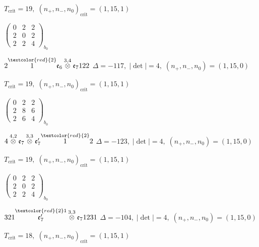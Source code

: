 \documentclass[10pt]{article}
\begin{document}
\hspace{1em}$T_{\text{crit}}=19,\; (n_+,n_-,n_0)_{\text{crit}}=(1,15,1)$

\hspace{2em}$\left(\begin{smallmatrix}0 & 2 & 2 \\ 2 & 0 & 2 \\ 2 & 2 & 4\end{smallmatrix}\right)_{\!b_0}$

\smallskip

$2\overset{\textcolor{red}{2}}{1}\mathfrak{e}_6\overset{3,4}{\otimes}\mathfrak{e}_7122$ \quad $\Delta=-117,\; |\det|=4,\; (n_+,n_-,n_0)=(1,15,0)$

\hspace{1em}$T_{\text{crit}}=19,\; (n_+,n_-,n_0)_{\text{crit}}=(1,15,1)$

\hspace{2em}$\left(\begin{smallmatrix}0 & 2 & 2 \\ 2 & 8 & 6 \\ 2 & 6 & 4\end{smallmatrix}\right)_{\!b_0}$

\smallskip

$4\overset{4,2}{\otimes}\mathfrak{e}_7\overset{3,3}{\otimes}\mathfrak{e}_7'\overset{\textcolor{red}{2}}{1}2$ \quad $\Delta=-123,\; |\det|=4,\; (n_+,n_-,n_0)=(1,15,0)$

\hspace{1em}$T_{\text{crit}}=19,\; (n_+,n_-,n_0)_{\text{crit}}=(1,15,1)$

\hspace{2em}$\left(\begin{smallmatrix}0 & 2 & 2 \\ 2 & 0 & 2 \\ 2 & 2 & 4\end{smallmatrix}\right)_{\!b_0}$

\smallskip

$321\overset{\textcolor{red}{2}1}{\mathfrak{e}_7'}\overset{3,3}{\otimes}\mathfrak{e}_71231$ \quad $\Delta=-104,\; |\det|=4,\; (n_+,n_-,n_0)=(1,15,0)$

\hspace{1em}$T_{\text{crit}}=18,\; (n_+,n_-,n_0)_{\text{crit}}=(1,15,1)$
\end{document}
